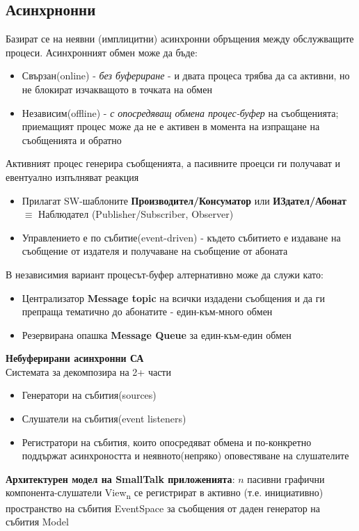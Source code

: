 \documentclass[11pt]{article} %
\begin{document}
\subsection{Асинхрнонни}
Базират се на неявни (имплицитни) асинхронни обръщения между обслужващите процеси. Асинхронният обмен може да бъде:
\begin{itemize}[noitemsep]
	\item Свързан(online) - \textit{без буфериране} - и двата процеса трябва да са активни, но не блокират изчакващото в точката на обмен
	\item Независим(offline) - \textit{с опосредяващ обмена процес-буфер} на съобщенията; приемащият процес може да не е активен в момента на изпращане на съобщенията и обратно
\end{itemize}
Активният процес генерира съобщенията, а пасивните проецси ги получават и евентуално изпълняват реакция
\begin{itemize}[noitemsep]
	\item Прилагат SW-шаблоните \textbf{Производител/Консуматор} или \textbf{ИЗдател/Абонат} $\equiv$ Наблюдател (Publisher/Subscriber, Observer)
	\item Управлението е по събитие(event-driven) - където събитието е издаване на съобщение от издателя и получаване на съобщение от абоната
\end{itemize}
В независимия вариант процесът-буфер алтернативно може да служи като:
\begin{itemize}[noitemsep]
	\item Централизатор \textbf{Message topic} на всички издадени съобщения и да ги препраща тематично до абонатите - един-към-много обмен
	\item Резервирана опашка \textbf{Message Queue} за един-към-един обмен\par
\end{itemize}

\textbf{Небуферирани асинхронни СА}\\
Системата за декомпозира на 2+ части
\begin{itemize}[noitemsep]
	\item Генератори на събития(sources)
	\item Слушатели на събития(event listeners)
	\item Регистратори на събития, които опосредяват обмена и по-конкретно поддържат асинхроността и неявното(непряко) оповестяване на слушателите
\end{itemize}

\textbf{Архитектурен модел на SmallTalk приложенията}: $n$ пасивни графични компонента-слушатели View\textsubscript{n} се регистрират в активно (т.е. инициативно) пространство на събития EventSpace за съобщения от даден генератор на събития Model\\\par
\end{document}
